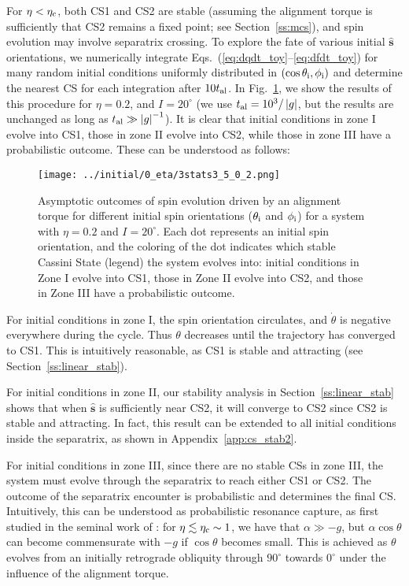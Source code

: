 \documentclass[
        fleqn,
        usenatbib,
        referee
    ]{mnras}
\newcommand*{\abs}[1]{\left|#1\right|}
\newcommand*{\p}[1]{\left(#1\right)}
\newcommand*{\uv}[1]{\hat{\boldsymbol{\mathbf{#1}}}}
\newlength{\colummwidth}
\begin{document}
For $\eta < \eta_{\rm c}$, both CS1 and CS2 are stable (assuming the alignment
torque is sufficiently that CS2 remains a fixed point; see
Section~\ref{ss:mcs}), and spin evolution may involve separatrix crossing. To
explore the fate of various initial $\uv{s}$ orientations, we numerically
integrate Eqs.~(\ref{eq:dqdt_toy}--\ref{eq:dfdt_toy}) for many random initial
conditions uniformly distributed in $\p{\cos \theta_{\rm i}, \phi_{\rm i}}$ and
determine the nearest CS for each integration after $10t_{\rm al}$. In
Fig.~\ref{fig:toy_phop}, we show the results of this procedure for $\eta = 0.2$,
and $I = 20^\circ$ (we use $t_{\rm al} = 10^3 / \abs{g}$, but the results are
unchanged as long as $t_{\rm al} \gg \abs{g}^{-1}$). It is clear that initial
conditions in zone I evolve into CS1, those in zone II evolve into CS2, while
those in zone III have a probabilistic outcome. These can be understood as
follows:
\begin{figure}
    \centering
    \texttt{[image: ../initial/0\_eta/3stats3\_5\_0\_2.png]}
    \caption{Asymptotic outcomes of spin evolution driven by an alignment torque
    for different initial spin orientations ($\theta_{\rm i}$ and $\phi_{\rm
    i}$) for a system with $\eta = 0.2$ and $I = 20^\circ$. Each dot represents
    an initial spin orientation, and the coloring of the dot indicates which
    stable Cassini State (legend) the system evolves into: initial conditions in
    Zone I evolve into CS1, those in Zone II evolve into CS2, and those in Zone
    III have a probabilistic outcome.}\label{fig:toy_phop}
\end{figure}

For initial conditions in zone I, the spin orientation circulates, and
$\dot{\theta}$ is negative everywhere during the cycle. Thus $\theta$ decreases
until the trajectory has converged to CS1. This is intuitively reasonable, as
CS1 is stable and attracting (see Section~\ref{ss:linear_stab}).

For initial conditions in zone II, our stability analysis in
Section~\ref{ss:linear_stab} shows that when $\uv{s}$ is sufficiently near CS2,
it will converge to CS2 since CS2 is stable and attracting. In fact, this result
can be extended to all initial conditions inside the separatrix, as shown in
Appendix~\ref{app:cs_stab2}.

For initial conditions in zone III, since there are no stable CSs in zone III,
the system must evolve through the separatrix to reach either CS1 or CS2.
The outcome of the separatrix encounter is probabilistic and determines the
final CS\@. Intuitively, this can be understood as probabilistic resonance
capture, as first studied in the seminal work of \citet{henrard1982}: for
$\eta \lesssim \eta_{\rm c} \sim 1$, we have that $\alpha \gg -g$, but $\alpha
\cos \theta$ can become commensurate with $-g$ if $\cos \theta$ becomes small.
This is achieved as $\theta$ evolves from an initially retrograde obliquity
through $90^\circ$ towards $0^\circ$ under the influence of the alignment
torque.
\end{document}
